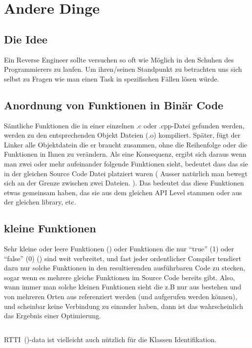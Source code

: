 \section{Andere Dinge}

\subsection{Die Idee}  

Ein Reverse Engineer sollte versuchen so oft wie M\"oglich in den Schuhen des Programmierers zu laufen.
Um ihren/seinen Standpunkt zu betrachten uns sich selbst zu Fragen wie man einen Task in spezifischen F\"allen l\"osen w\"urde.

\subsection{Anordnung von Funktionen in Bin\"ar Code}  

S\"amtliche Funktionen die in einer einzelnen .c oder .cpp-Datei gefunden werden, werden zu den entsprechenden Objekt Dateien (.o) kompiliert. Sp\"ater, f\"ugt der Linker alle Objektdatein die er braucht zusammen, ohne die Reihenfolge oder die Funktionen in Ihnen zu ver\"andern. Als eine Konsequenz, ergibt sich daraus wenn man zwei oder mehr aufeinander folgende Funktionen sieht, bedeutet dass das sie in der gleichen Source Code Datei platziert waren ( Ausser nat\"urlich man bewegt sich an der Grenze zwischen zwei Dateien. ).  Das bedeutet
das diese Funktionen etwas gemeinsam haben, das sie aus dem gleichen \ac{API} Level stammen oder aus der gleichen library, etc.

\subsection{kleine Funktionen} 

Sehr kleine oder leere Funktionen  ()
oder Funktionen die nur ``true'' (1) oder ``false'' (0) () sind weit verbreitet,
und fast jeder ordentlicher Compiler tendiert dazu nur solche Funktionen in den resultierenden ausf\"uhrbaren Code zu stecken,
sogar wenn es mehrere gleiche Funktionen im Source Code bereits gibt. 
Also, wann immer man solche kleinen Funktionen sieht die z.B nur aus  bestehen und von mehreren 
Orten aus referenziert werden (und aufgerufen werden k\"onnen), und scheinbar keine Verbindung zu einander haben, dann 
ist das wahrscheinlich das Ergebnis einer Optimierung. 

\subsection{\Cpp}

\ac{RTTI}~()-data ist vielleicht auch n\"utzlich f\"ur die \Cpp Klassen Identifikation.
